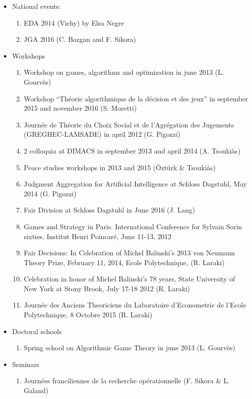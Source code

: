 \documentclass[version=last, pagesize, twoside=semi, DIV=calc, 12pt, a4paper, french, english, bibliography=totoc]{scrartcl}
\begin{document}
\begin{itemize}
\item National events:
\begin{enumerate} 
\item EDA  2014 (Vichy) by Elsa Negre  
\item JGA 2016 (C. Bazgan and F. Sikora)
\end{enumerate}
\item Workshops
\begin{enumerate} 
\item Workshop on games, algorithms and optimization in june 2013 (L. Gourv\`es)
\item Workshop “Th\'eorie algorithmique de la décision et des jeux” in september 2015 and november 2016 (S. Moretti)
\item Journ\'ee de Th\'eorie du Choix Social et de l'Agr\'egation des Jugements (GREGHEC-LAMSADE) in april 2012 (G. Pigozzi)
\item 2 colloquia at DIMACS in september 2013 and april 2014 (A. Tsouki\`as)
\item Peace studies workshops in 2013 and 2015 (\"Ozt\"urk \& Tsouki\`as)  
\item Judgment Aggregation for Artiﬁcial Intelligence at Schloss Dagstuhl, May 2014 (G. Pigozzi)
\item Fair Division at Schloss Dagstuhl in June 2016 (J. Lang)
\item Games and Strategy in Paris. International Conference for Sylvain Sorin sixties. Institut Henri Poincar\'e, June 11-13, 2012
\item Fair Decisions: In Celebration of Michel Balinski's 2013 von Neumann Theory Prize, February 11, 2014, Ecole Polytechnique, (R. Laraki)
\item Celebration in honor of Michel Balinski’s 78 years, State University of New York at Stony Brook, July 17-18 2012 (R. Laraki)
\item Journ\'ee des Anciens Theoriciens du Laboratoire d'Econometrie de l'Ecole Polytechnique, 8 Octobre 2015 (R. Laraki) 
\end{enumerate}

\item Doctoral schools

\begin{enumerate} 
\item Spring school on Algorithmic Game Theory in  june 2013 (L. Gourv\`es)
\end{enumerate}

\item Seminars

\begin{enumerate} 
\item Journ\'ees franciliennes de la recherche opérationnelle (F. Sikora \& L. Galand)
\end{enumerate}
\end{itemize}
\end{document}
